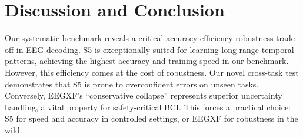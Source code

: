 \documentclass{article}
\newcommand{\eegtrans}{EEGXF}
\begin{document}
\section{Discussion and Conclusion}
\label{sec:conclusion}

Our systematic benchmark reveals a critical accuracy-efficiency-robustness trade-off in EEG decoding. S5 is exceptionally suited for learning long-range temporal patterns, achieving the highest accuracy and training speed in our benchmark. However, this efficiency comes at the cost of robustness. Our novel cross-task test demonstrates that S5 is prone to overconfident errors on unseen tasks. Conversely, \eegtrans{}'s ``conservative collapse'' represents superior uncertainty handling, a vital property for safety-critical BCI. This forces a practical choice: S5 for speed and accuracy in controlled settings, or \eegtrans{} for robustness in the wild.

\clearpage


\end{document}
